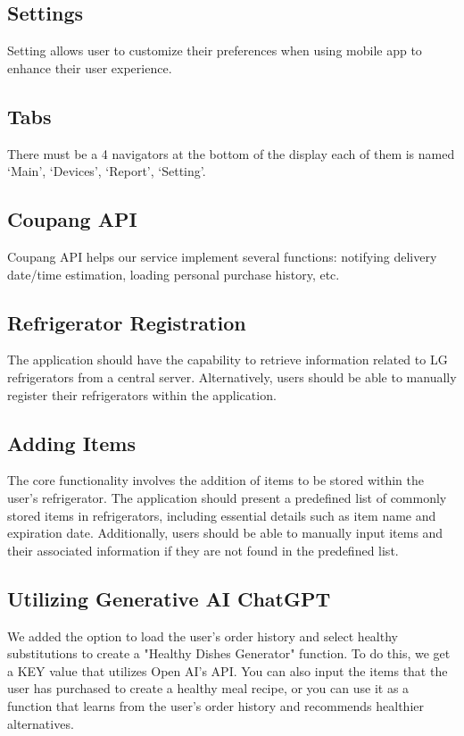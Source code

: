 \documentclass[conference]{IEEEtran}
\begin{document}
\subsection{Settings}
Setting allows user to customize their preferences when using mobile app to enhance their user experience.
\subsection{Tabs}
There must be a 4 navigators at the bottom of the display each of them is named ‘Main’, ‘Devices’, ‘Report’, ‘Setting’.

\subsection{Coupang API}
Coupang API helps our service implement several functions: notifying delivery date/time estimation, loading personal purchase history, etc.


\subsection{Refrigerator Registration}
The application should have the capability to retrieve information related to LG refrigerators from a central server. Alternatively, users should be able to manually register their refrigerators within the application.

\subsection{Adding Items}
The core functionality involves the addition of items to be stored within the user's refrigerator. The application should present a predefined list of commonly stored items in refrigerators, including essential details such as item name and expiration date. Additionally, users should be able to manually input items and their associated information if they are not found in the predefined list.

\subsection{Utilizing Generative AI ChatGPT}
We added the option to load the user's order history and select healthy substitutions to create a "Healthy Dishes Generator" function. To do this, we get a KEY value that utilizes Open AI's API. You can also input the items that the user has purchased to create a healthy meal recipe, or you can use it as a function that learns from the user's order history and recommends healthier alternatives.
\end{document}
